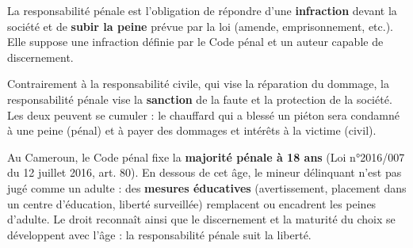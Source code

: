 \documentclass[11pt]{article}
\newcommand{\cle}[1]{{\popxbold\color{popdark}#1}}
\begin{document}
\begin{definition}
La \cle{responsabilité pénale} est l'obligation de répondre d'une \textbf{infraction} devant la société et de \textbf{subir la peine} prévue par la loi (amende, emprisonnement, etc.). Elle suppose une infraction définie par le Code pénal et un auteur capable de discernement.
\end{definition}

Contrairement à la responsabilité civile, qui vise la réparation du dommage, la responsabilité pénale vise la \textbf{sanction} de la faute et la protection de la société. Les deux peuvent se cumuler : le chauffard qui a blessé un piéton sera condamné à une peine (pénal) et à payer des dommages et intérêts à la victime (civil).

\begin{exemplebox}
Au Cameroun, le Code pénal fixe la \textbf{majorité pénale à 18 ans} (Loi n°2016/007 du 12 juillet 2016, art. 80). En dessous de cet âge, le mineur délinquant n'est pas jugé comme un adulte : des \textbf{mesures éducatives} (avertissement, placement dans un centre d'éducation, liberté surveillée) remplacent ou encadrent les peines d'adulte. Le droit reconnaît ainsi que le discernement et la maturité du choix se développent avec l'âge : la responsabilité pénale suit la liberté.
\end{exemplebox}
\end{document}

